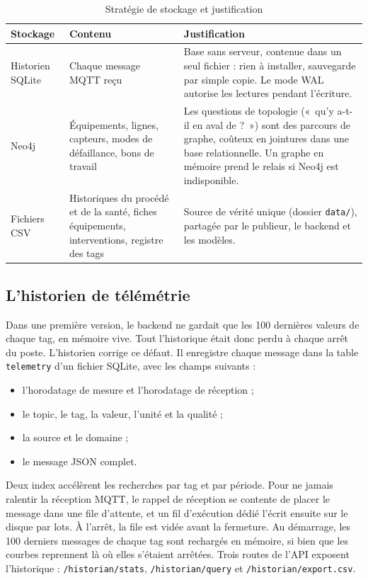 \begin{table}[H]
\centering
\caption{Stratégie de stockage et justification}
\label{tab:stockage}
\begin{tabularx}{\textwidth}{>{\raggedright\arraybackslash}p{2.6cm} >{\raggedright\arraybackslash}p{3.6cm} X}
\toprule
\textbf{Stockage} & \textbf{Contenu} & \textbf{Justification} \\
\midrule
Historien SQLite~\cite{sqlite} & Chaque message MQTT reçu & Base sans serveur, contenue dans un seul fichier : rien à installer, sauvegarde par simple copie. Le mode WAL autorise les lectures pendant l'écriture. \\
Neo4j~\cite{neo4j} & Équipements, lignes, capteurs, modes de défaillance, bons de travail & Les questions de topologie («~qu'y a-t-il en aval de ?~») sont des parcours de graphe, coûteux en jointures dans une base relationnelle. Un graphe en mémoire prend le relais si Neo4j est indisponible. \\
Fichiers CSV & Historiques du procédé et de la santé, fiches équipements, interventions, registre des tags & Source de vérité unique (dossier \texttt{data/}), partagée par le publieur, le backend et les modèles. \\
\bottomrule
\end{tabularx}
\end{table}

\subsection{L'historien de télémétrie}
\label{sec:historien}
Dans une première version, le backend ne gardait que les 100 dernières valeurs de chaque tag, en mémoire vive. Tout l'historique était donc perdu à chaque arrêt du poste. L'historien corrige ce défaut. Il enregistre chaque message dans la table \texttt{telemetry} d'un fichier SQLite, avec les champs suivants :
\begin{itemize}
  \item l'horodatage de mesure et l'horodatage de réception ;
  \item le topic, le tag, la valeur, l'unité et la qualité ;
  \item la source et le domaine ;
  \item le message JSON complet.
\end{itemize}
Deux index accélèrent les recherches par tag et par période. Pour ne jamais ralentir la réception MQTT, le rappel de réception se contente de placer le message dans une file d'attente, et un fil d'exécution dédié l'écrit ensuite sur le disque par lots. À l'arrêt, la file est vidée avant la fermeture. Au démarrage, les 100 derniers messages de chaque tag sont rechargés en mémoire, si bien que les courbes reprennent là où elles s'étaient arrêtées. Trois routes de l'API exposent l'historique : \texttt{/historian/stats}, \texttt{/historian/query} et \texttt{/historian/export.csv}.

